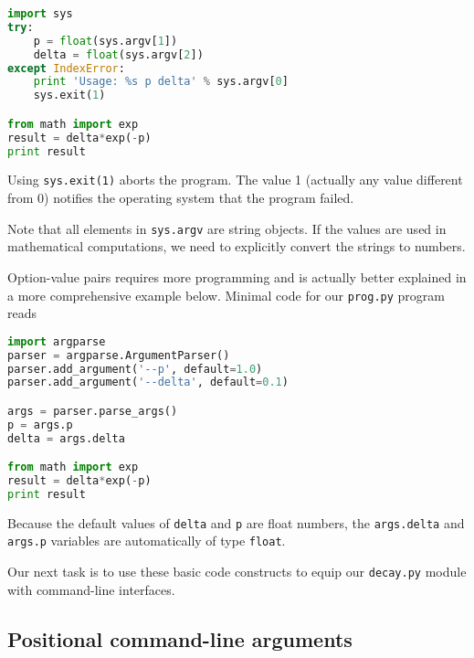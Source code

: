 \documentclass[graybox,sectrefs,envcountresetchap,open=right,final]{svmonodo}
\newenvironment{warning_mdfboxadmon}[1][]{
\begin{warning_mdfboxmdframed}[frametitle=#1]
}
{
\end{warning_mdfboxmdframed}
}
\begin{document}
\begin{lstlisting}[language=python,style=blue1bar_bluegreen]
import sys
try:
    p = float(sys.argv[1])
    delta = float(sys.argv[2])
except IndexError:
    print 'Usage: %s p delta' % sys.argv[0]
    sys.exit(1)

from math import exp
result = delta*exp(-p)
print result

\end{lstlisting}

Using \texttt{sys.exit(1)} aborts the program. The value 1 (actually any
value different from 0) notifies the operating system that the
program failed.


\begin{warning_mdfboxadmon}
Note that all elements in \texttt{sys.argv} are string objects.
If the values are used in mathematical computations, we need
to explicitly convert the strings to numbers.
\end{warning_mdfboxadmon} %



Option-value pairs requires more programming and is actually
better explained in a more comprehensive example below.
Minimal code for our \texttt{prog.py} program reads














\begin{lstlisting}[language=python,style=blue1bar_bluegreen]
import argparse
parser = argparse.ArgumentParser()
parser.add_argument('--p', default=1.0)
parser.add_argument('--delta', default=0.1)

args = parser.parse_args()
p = args.p
delta = args.delta

from math import exp
result = delta*exp(-p)
print result

\end{lstlisting}

Because the default values of \texttt{delta} and \texttt{p} are float numbers,
the \texttt{args.delta} and \texttt{args.p} variables are automatically of type \texttt{float}.

Our next task is to use these basic code constructs to equip our
\texttt{decay.py} module with command-line interfaces.

\subsection{Positional command-line arguments}
\label{softeng1:basic:UI:pos_cml}
\end{document}
